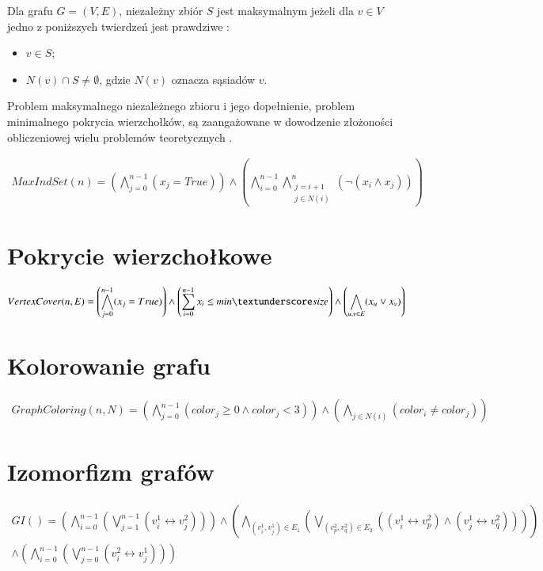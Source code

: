 Dla grafu $G = (V, E)$, niezależny zbiór \(S\) jest maksymalnym jeżeli dla $v \in V$ jedno z poniższych twierdzeń jest prawdziwe \cite{maxIndSetDef}:

\begin{itemize}
	\item $v \in S$;
	\item $N(v) \cap S \neq \emptyset$, gdzie \(N(v)\) oznacza sąsiadów \(v\).
\end{itemize}

Problem maksymalnego niezależnego zbioru i jego dopełnienie, problem minimalnego pokrycia wierzchołków, są zaangażowane w dowodzenie złożoności obliczeniowej wielu problemów teoretycznych \cite{Skiena20}.



\begin{align*}
	MaxIndSet(n) = \left( \bigwedge_{j=0}^{n-1} (x_j = True) \right) \land 
	\left( \bigwedge_{i=0}^{n-1} \bigwedge_{\substack{j=i+1 \\ j \in N(i)}}^{n} (\lnot(x_i \land x_j)) \right)	
\end{align*}

\section{Pokrycie wierzchołkowe}

\begin{align*}
	VertexCover(n, E) = \left( \bigwedge_{j=0}^{n-1} (x_j = True) \right) \land 
	\left( \sum_{i=0}^{n-1} x_i\leq min\textunderscore size \right) \land 
	\left( \bigwedge_{u, v \in E} (x_u \lor x_v) \right)
\end{align*}

\section{Kolorowanie grafu}

\begin{align*}
	GraphColoring(n, N) = \left( \bigwedge_{j=0}^{n-1} (color_j \geq 0 \land color_j < 3) \right) \land 
	\left( \bigwedge_{j \in N(i)} (color_i \neq color_j) \right)
\end{align*}

\section{Izomorfizm grafów}

\begin{align*}
	GI() = \left( \bigwedge_{i=0}^{n-1} \left( \bigvee_{j=1}^{n-1} (v_i^1 \leftrightarrow v_j^2) \right) \right) 
	\land \left( \bigwedge_{(v_i^1, v_j^1) \in E_1} \left( \bigvee_{(v_p^2, v_q^2) \in E_2} ((v_i^1 \leftrightarrow v_p^2) \land (v_j^1 \leftrightarrow v_q^2)) \right) \right) \\
	\land \left( \bigwedge_{i=0}^{n-1} \left( \bigvee_{j=0}^{n-1} (v_i^2 \leftrightarrow v_j^1) \right) \right)	
\end{align*}


